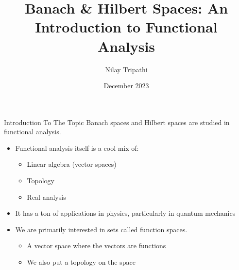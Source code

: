 \documentclass[10pt]{beamer}
\title{Banach \& Hilbert Spaces: An Introduction to Functional Analysis}
\subtitle{}
\author{Nilay Tripathi}
\date{December 2023}
\begin{document}
    \maketitle

    \begin{frame}{Introduction To The Topic}
				Banach spaces and Hilbert spaces are studied in \alert{functional analysis}.
        \begin{itemize}
            \item Functional analysis itself is a cool mix of: 
            \begin{itemize}
                \item Linear algebra (vector spaces)
                \item Topology 
                \item Real analysis
            \end{itemize}
            \item It has a ton of applications in physics, particularly in quantum mechanics
            \item We are primarily interested in sets called \alert{function spaces}. 
            \begin{itemize}
                \item A vector space where the vectors are functions 
                \item We also put a topology on the space
            \end{itemize}
        \end{itemize}
    \end{frame}
\end{document}
